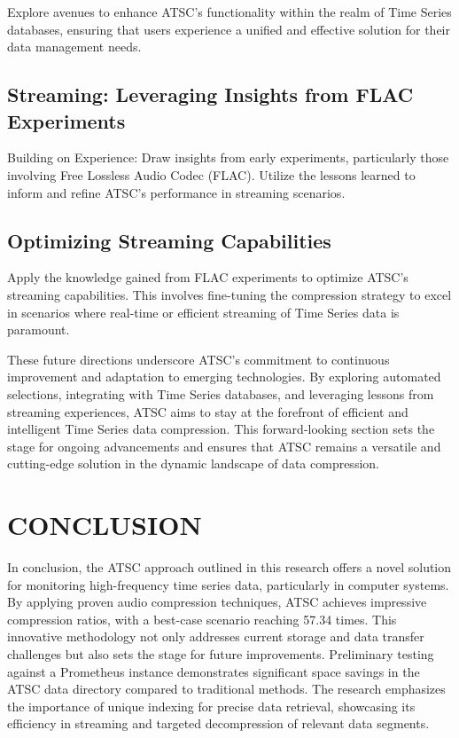 \documentclass[conference]{IEEEtran}
\begin{document}
Explore avenues to enhance ATSC's functionality within the realm of Time Series databases, ensuring that users experience a unified and effective solution for their data management needs.

\subsection{Streaming: Leveraging Insights from FLAC Experiments}

Building on Experience: Draw insights from early experiments, particularly those involving Free Lossless Audio Codec (FLAC). Utilize the lessons learned to inform and refine ATSC's performance in streaming scenarios.

\subsection{Optimizing Streaming Capabilities}

Apply the knowledge gained from FLAC experiments to optimize ATSC's streaming capabilities. This involves fine-tuning the compression strategy to excel in scenarios where real-time or efficient streaming of Time Series data is paramount.

These future directions underscore ATSC's commitment to continuous improvement and adaptation to emerging technologies. By exploring automated selections, integrating with Time Series databases, and leveraging lessons from streaming experiences, ATSC aims to stay at the forefront of efficient and intelligent Time Series data compression. This forward-looking section sets the stage for ongoing advancements and ensures that ATSC remains a versatile and cutting-edge solution in the dynamic landscape of data compression.


\section{CONCLUSION}

In conclusion, the ATSC approach outlined in this research offers a novel solution for monitoring high-frequency time series data, particularly in computer systems. By applying proven audio compression techniques, ATSC achieves impressive compression ratios, with a best-case scenario reaching 57.34 times. This innovative methodology not only addresses current storage and data transfer challenges but also sets the stage for future improvements.
\vspace{5pt}
Preliminary testing against a Prometheus instance demonstrates significant space savings in the ATSC data directory compared to traditional methods. The research emphasizes the importance of unique indexing for precise data retrieval, showcasing its efficiency in streaming and targeted decompression of relevant data segments.
\end{document}
